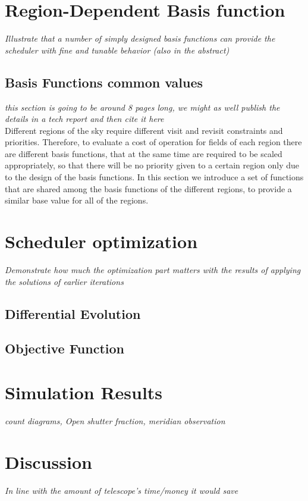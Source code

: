 \documentclass[12pt]{article}
\begin{document}
\section{Region-Dependent Basis function } \label{subsec-BF}
\textit{Illustrate that a number of simply designed basis functions can provide the scheduler with fine and tunable behavior (also in the abstract)}\\
\subsection{Basis Functions common values}
\textit{this section is going to be around 8 pages long, we might as well publish the details in a tech report and then cite it here}\\
Different regions of the sky require different visit and revisit constraints and priorities. Therefore, to evaluate a cost of operation for fields of each region there are different basis functions, that at the same time are required to be scaled appropriately, so that there will be no priority given to a certain region only due to the design of the basis functions. In this section we introduce a set of functions that are shared among the basis functions of the different regions, to provide a similar base value for all of the regions.
 
\section{Scheduler optimization}
\textit{Demonstrate how much the optimization part matters with the results of applying the solutions of earlier iterations}
\subsection{Differential Evolution}

\subsection{Objective Function}

\section{Simulation Results}\label{sec_sim}
\textit{count diagrams, Open shutter fraction, meridian observation}
\section{Discussion}
\textit{In line with the amount of telescope's time/money it would save}




\medskip

\newpage 

%


\end{document}
